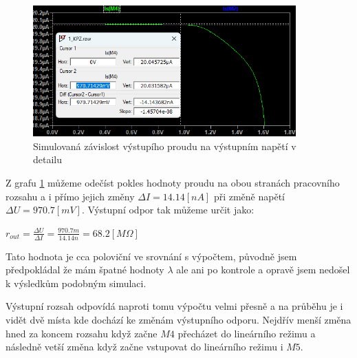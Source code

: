\begin{figure}[h!]
    \centering
    \includegraphics[width=0.9\textwidth]{text/img/KPZ-dc-graf-detail.png}
    \caption{\label{fig:KPZ-dc-graf-detail} Simulovaná závislost výstupího proudu na výstupním napětí v detailu}
\end{figure}

Z grafu \ref{fig:KPZ-dc-graf-detail} můžeme odečíst pokles hodnoty proudu na obou stranách pracovního rozsahu a i přímo jejich změny \(\Delta I = 14.14 [nA]\) při změně napětí \(\Delta U = 970.7 [mV]\).
Výstupní odpor tak můžeme určit jako:

\begin{center}
    \large
    \(
        r_{out} = \frac{\Delta U}{\Delta I} = \frac{970.7m}{14.14n} = 68.2 [M\Omega] 
    \)
\end{center}

Tato hodnota je cca poloviční ve srovnání s výpočtem, původně jsem předpokládal že mám špatné hodnoty \(\lambda\) ale ani po kontrole a opravě jsem nedošel k výsledkům podobným simulaci.

Výstupní rozsah odpovídá naproti tomu výpočtu velmi přesně a na průběhu je i vidět dvě místa kde dochází ke změnám výstupního odporu.
Nejdřív menší změna hned za koncem rozsahu když začne \(M4\) přecházet do lineárního režimu a následně vetší změna když začne vstupovat do lineárního režimu i \(M5\).